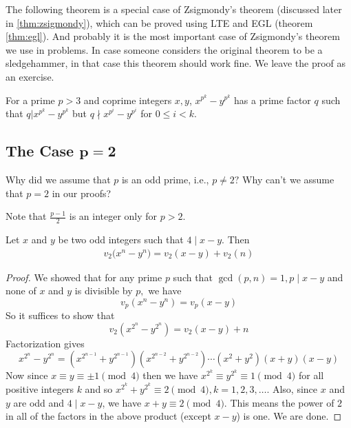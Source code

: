 \documentclass[main.tex]{subfile}
\begin{document}
    The following theorem is a  special case of Zsigmondy's theorem (discussed later in \eqref{thm:zsigmondy}), which can be proved using LTE and EGL (theorem \eqref{thm:egl}). And probably it is the most important case of Zsigmondy's theorem  we use in problems. In case someone considers the original theorem to be a sledgehammer, in that case this theorem should work fine. We leave the proof as an exercise.

    \begin{theorem}
    	For a prime $p>3$ and coprime integers $x,y$, $x^{p^k}-y^{p^k}$ has a prime factor $q$ such that $q|x^{p^k}-y^{p^k}$ but $q\nmid x^{p^i}-y^{p^i}$ for $0\le i<k$.
    \end{theorem}


\subsection{The Case \texorpdfstring{$\boldsymbol{p=2}$}{p = 2}}

    \begin{question}
        Why did we assume that $p$ is an odd prime, i.e., $p \neq 2 ?$ Why can't we assume that $p=2$ in our proofs?
    \end{question}

    \begin{hint}
        Note that $\frac{p-1}{2}$ is an integer only for $p>2.$
    \end{hint}


    \begin{theorem}[LTE for $p = 2$]
        Let $x$ and $y$ be two odd integers such that $4 \mid x-y.$ Then
         \begin{align*}
         	v_2  \big(x^n - y^n \big) = v_2  (x-y ) + v_2  (n )
         \end{align*}
    \end{theorem}

    \begin{proof}
        We showed that for any prime $p$ such that $\gcd(p,n)=1, p \mid x-y$ and  none of $x$ and $y$ is divisible by $p,$ we have
            \[v_p(  x^n - y^n ) = v_p(  x - y )\]
        So it suffices to show that
            \[v_2(  x^{2^{n}} - y^{2^{n}} ) = v_2(  x-y ) + n\]
        Factorization gives
            \[x^{2^{n}} - y^{2^{n}} = (x^{2^{n-1}} + y^{2^{n-1}})(x^{2^{n-2}} + y^{2^{n-2}}) \cdots (x^2 + y^2 )(x + y)(x - y) \]
        Now since $x \equiv y \equiv \pm 1\pmod 4$ then we have $x^{2^{k}}  \equiv  y^{2^{k}} \equiv 1 \pmod 4$ for all positive integers $k$ and so $x^{2^{k}} + y^{2^{k}} \equiv 2 \pmod 4, k=1,2,3,\ldots.$ Also, since $x$ and $y$ are odd and $4\mid x-y$, we have $x+y \equiv 2\pmod 4$.
        This means the power of $2$ in all of the factors in the above product (except $x-y$) is one. We are done.
    \end{proof}
\end{document}
